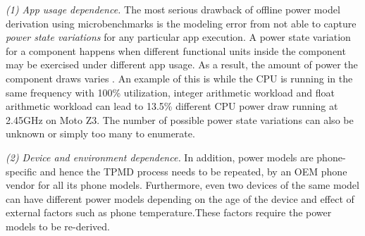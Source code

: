 {\it (1) App usage dependence.}
{The most serious drawback of offline power model derivation 
using microbenchmarks is the modeling error 
from not able to capture {\it power state variations} for any particular app execution.  
}
A power state variation for a component happens when different 
functional units inside the component may be exercised under different 
app usage. As a result, the amount of power the component draws varies  . 
An example of this is while the CPU is running in the same frequency with  100\% utilization, 
integer arithmetic workload and float arithmetic workload can lead to 13.5\% 
different CPU power draw running at 2.45GHz on Moto Z3.
The number of possible power state variations can also be unknown or simply 
too many to enumerate.

\fi 

{\it (2) Device and environment dependence.}
In addition, power models are phone-specific and hence the TPMD process needs to be repeated,
\eg by an OEM phone vendor for all its phone models. 
Furthermore, even two devices of the same model can have different 
power models depending on the age of the device and effect of 
external factors such as phone temperature.These factors require 
the power models to be re-derived.

